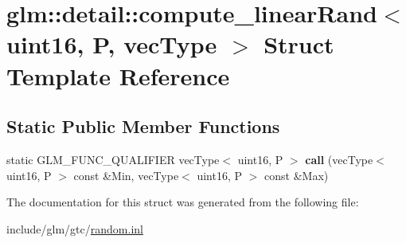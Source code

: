 \hypertarget{structglm_1_1detail_1_1compute__linearRand_3_01uint16_00_01P_00_01vecType_01_4}{}\section{glm\+:\+:detail\+:\+:compute\+\_\+linear\+Rand$<$ uint16, P, vec\+Type $>$ Struct Template Reference}
\label{structglm_1_1detail_1_1compute__linearRand_3_01uint16_00_01P_00_01vecType_01_4}
\subsection*{Static Public Member Functions}
\begin{DoxyCompactItemize}
\item 
\mbox{\label{structglm_1_1detail_1_1compute__linearRand_3_01uint16_00_01P_00_01vecType_01_4_a3a569e5edff462a90e4c2deeeed6f4cf}} 
static G\+L\+M\+\_\+\+F\+U\+N\+C\+\_\+\+Q\+U\+A\+L\+I\+F\+I\+ER vec\+Type$<$ uint16, P $>$ {\bfseries call} (vec\+Type$<$ uint16, P $>$ const \&Min, vec\+Type$<$ uint16, P $>$ const \&Max)
\end{DoxyCompactItemize}


The documentation for this struct was generated from the following file\+:\begin{DoxyCompactItemize}
\item 
include/glm/gtc/\hyperlink{random_8inl}{random.\+inl}\end{DoxyCompactItemize}
